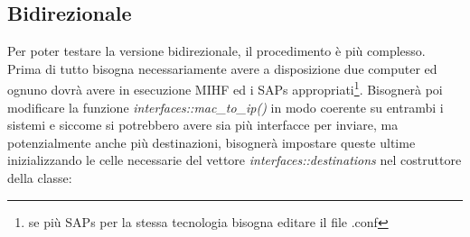 \subsection{Bidirezionale}

Per poter testare la versione bidirezionale, il procedimento è più complesso. Prima di tutto bisogna necessariamente avere a disposizione due computer ed ognuno dovrà avere in esecuzione MIHF ed i SAPs appropriati\footnote{se più SAPs per la stessa tecnologia bisogna editare il file .conf}. Bisognerà poi modificare la funzione {\em interfaces::mac\_to\_ip()} in modo coerente su entrambi i sistemi e siccome si potrebbero avere sia più interfacce per inviare, ma potenzialmente anche più destinazioni, bisognerà impostare queste ultime inizializzando le celle necessarie del vettore {\em interfaces::destinations} nel costruttore della classe:

